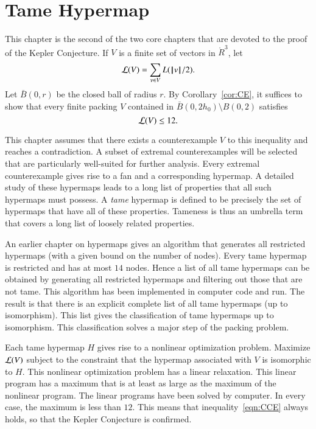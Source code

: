 

\chapter{Tame Hypermap}
%

\label{sec:tame}
%

\begin{summary}
This chapter is the second of the two core chapters that are devoted to the proof of the Kepler Conjecture.  If $V$ is a finite set of vectors in $\ring{R}^3$, let
$${\mathcal L}(V) = \sum_{v\in V} L({{\hskip0.1em|\hskip-0.15em|\hskip0.1em}v{\hskip0.1em|\hskip-0.15em|\hskip0.1em}}/2).$$
Let $\bar B(0,r)$ be the closed ball of radius $r$.
By Corollary~\ref{cor:CE}, it suffices to show that every finite packing $V$
contained in $\bar B(0,2h_0)\setminus B(0,2)$
satisfies
\begin{equation}\label{eqn:CCE}
{\mathcal L}(V) \le 12.
\end{equation}

This chapter assumes that there exists a counterexample $V$ to this inequality and reaches a contradiction.  A subset of extremal counterexamples will be selected that are particularly well-suited for further analysis.  Every extremal counterexample gives rise to a fan and a corresponding hypermap.  
A detailed study of these hypermaps leads to a long list of properties that all such hypermaps must
possess.   A {\it tame} hypermap is defined to be precisely the set of hypermaps that have all of these
properties.   Tameness is thus an umbrella term that covers a long list of loosely related properties.

An earlier chapter on hypermaps gives an algorithm that generates all restricted hypermaps (with a given bound on the number of nodes).   Every tame hypermap is restricted and has at most $14$ nodes.  Hence a list of all tame hypermaps can be obtained by generating all restricted hypermaps and filtering out those that are not tame.   This algorithm has been implemented in computer code and run.  The result is that there is an explicit complete list of all tame hypermaps (up to isomorphism).  
This list gives the classification of tame hypermaps up to isomorphism.   This classification solves a
major step of the packing problem.

Each tame hypermap $H$ gives rise to a nonlinear optimization problem.   Maximize ${\mathcal L}(V)$ subject to the constraint that the hypermap associated with  $V$ 
is isomorphic to $H$.  This nonlinear optimization problem has a linear relaxation.  This linear program has
a maximum that is at least as large as the maximum of the nonlinear program.  The linear programs
have been solved by computer.  In every case, the maximum is less than $12$.  This means
that inequality~\ref{eqn:CCE} always holds, so that the Kepler Conjecture is confirmed.
\end{summary}
%
%



